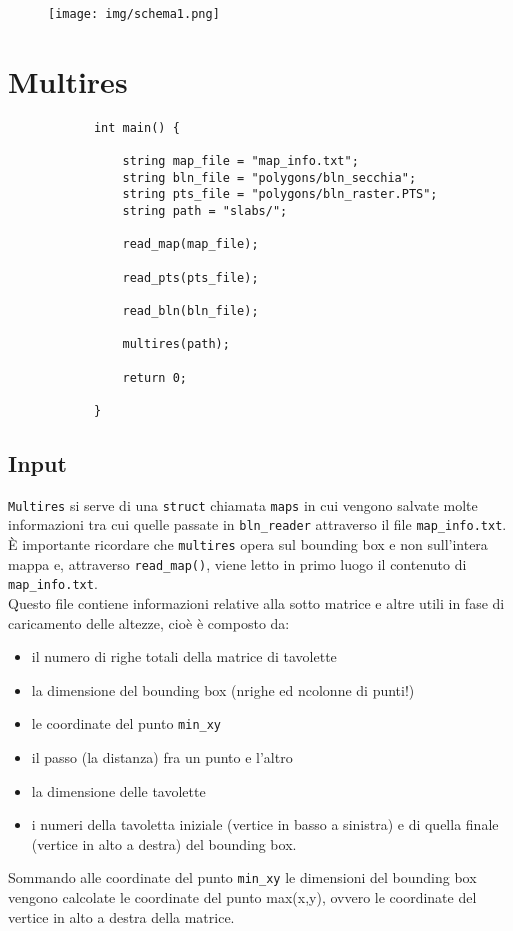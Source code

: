 			\begin{figure}[htbp]
				\centering
				\texttt{[image: img/schema1.png]}
			\end{figure}
	\newpage
	\section{Multires}
		\begin{verbatim}
			int main() {
	
			    string map_file = "map_info.txt";
			    string bln_file = "polygons/bln_secchia";
			    string pts_file = "polygons/bln_raster.PTS";
			    string path = "slabs/";

			    read_map(map_file);

			    read_pts(pts_file);

			    read_bln(bln_file);

			    multires(path);

			    return 0;

			}
		\end{verbatim} 
		\subsection{Input}
			\texttt{Multires} si serve di una \texttt{struct} chiamata \texttt{maps} in cui vengono salvate molte informazioni tra cui quelle passate in \texttt{bln\_reader} attraverso il file \texttt{map\_info.txt}.
			\`{E} importante ricordare che \texttt{multires} opera sul bounding box e non sull'intera mappa e, attraverso \texttt{read\_map()}, viene letto in primo luogo il contenuto di \texttt{map\_info.txt}. \\Questo file contiene informazioni relative alla sotto matrice e altre utili in fase di caricamento delle altezze, cio\`{e} \`{e} composto da:
			\begin{itemize}
				\item il numero di righe totali della matrice di tavolette
				\item la dimensione del bounding box (nrighe ed ncolonne di punti!)
				\item le coordinate del punto \texttt{min\_xy}
				\item il passo (la distanza) fra un punto e l'altro
				\item la dimensione delle tavolette
				\item i numeri della tavoletta iniziale (vertice in basso a sinistra) e di quella finale (vertice in alto a destra) del bounding box.
			\end{itemize}
			Sommando alle coordinate del punto \texttt{min\_xy} le dimensioni del bounding box vengono calcolate le coordinate del punto max(x,y), ovvero le coordinate del vertice in alto a destra della matrice.
			
